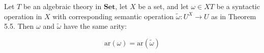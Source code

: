 Let $T$ be an algebraic theory in $\mathbf{Set}$, let $X$ be a set, and let $\omega \in XT$ be a syntactic operation in $X$ with corresponding semantic operation $\tilde{\omega}: U^X \longrightarrow U$ as in Theorem 5.5. Then $\omega$ and $\tilde{\omega}$ have the same arity:

$$\mathrm{ar}(\omega) = \mathrm{ar}(\tilde{\omega})$$

